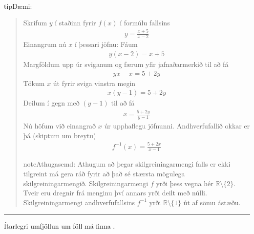 \documentclass[a4paper,10pt,icelandic]{sphinxmanual}
\begin{document}
\begin{sphinxadmonition}{tip}{Dæmi:}
\begin{quote}
Skrifum \(y\) í staðinn fyrir \(f(x)\) í formúlu fallsins
\begin{equation*}
\begin{split}y=\frac{x+5}{x-2}\end{split}
\end{equation*}
Einangrum nú \(x\) í þessari jöfnu:
Fáum
\begin{equation*}
\begin{split}y(x-2)=x+5\end{split}
\end{equation*}
Margföldum upp úr sviganum og færum yfir jafnaðarmerkið til að fá
\begin{equation*}
\begin{split}yx-x=5+2y\end{split}
\end{equation*}
Tökum \(x\) út fyrir sviga vinstra megin
\begin{equation*}
\begin{split}x(y-1)=5+2y\end{split}
\end{equation*}
Deilum í gegn með \((y-1)\) til að fá
\begin{equation*}
\begin{split}x=\frac{5+2y}{y-1}\end{split}
\end{equation*}
Nú höfum við einangrað \(x\) úr upphaflegu jöfnunni. Andhverfufallið okkar er þá (skiptum um breytu)
\begin{equation*}
\begin{split}f^{-1}(x)=\frac{5+2x}{x-1}\end{split}
\end{equation*}
\begin{sphinxadmonition}{note}{Athugasemd:}
Athugum að þegar skilgreiningarmengi falls er ekki tilgreint má gera ráð fyrir að það sé stærsta mögulega skilgreiningarmengið. Skilgreiningarmengi \(f\) yrði þess vegna hér \(\mathbb{R}\setminus\{2\}\). Tveir eru dregnir frá menginu því annars yrði deilt með núlli. Skilgreiningarmengi andhverfufallsins \(f^{-1}\) yrði \(\mathbb{R}\setminus\{1\}\) út af sömu ástæðu.
\end{sphinxadmonition}
\end{quote}
\end{sphinxadmonition}


\bigskip\hrule\bigskip


Ítarlegri umfjöllun um föll má finna {\hyperref[\detokenize{Kafli09:s-meiraumfoll}]{}} .
\end{document}
